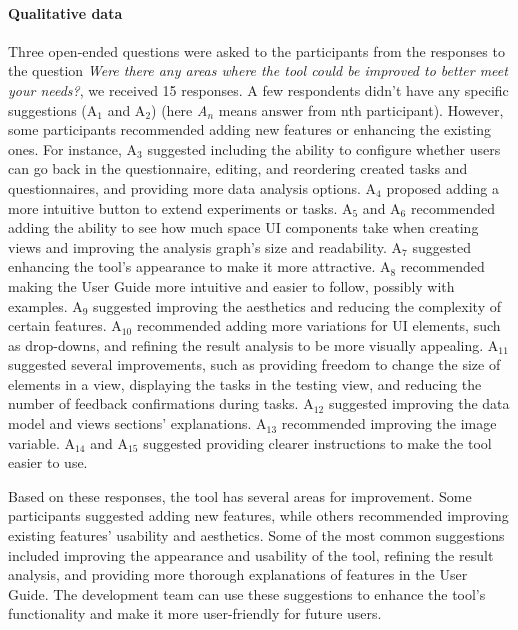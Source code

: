 \paragraph{Qualitative data}
Three open-ended questions were asked to the participants from the responses to the question \textit{Were there any areas where the tool could be improved to better meet your needs?}, we received 15 responses. 
A few respondents didn't have any specific suggestions (A$_1$ and A$_2$) (here \textit{A$_n$} means answer from nth participant). 
However, some participants recommended adding new features or enhancing the existing ones. 
For instance, A$_3$ suggested including the ability to configure whether users can go back in the questionnaire, editing, and reordering created tasks and questionnaires, and providing more data analysis options. 
A$_4$ proposed adding a more intuitive button to extend experiments or tasks. 
A$_5$ and A$_6$ recommended adding the ability to see how much space UI components take when creating views and improving the analysis graph's size and readability. 
A$_7$ suggested enhancing the tool's appearance to make it more attractive. 
A$_8$ recommended making the User Guide more intuitive and easier to follow, possibly with examples. 
A$_9$ suggested improving the aesthetics and reducing the complexity of certain features. 
A$_{10}$ recommended adding more variations for UI elements, such as drop-downs, and refining the result analysis to be more visually appealing. 
A$_{11}$ suggested several improvements, such as providing freedom to change the size of elements in a view, displaying the tasks in the testing view, and reducing the number of feedback confirmations during tasks.
A$_{12}$ suggested improving the data model and views sections' explanations.
A$_{13}$ recommended improving the image variable. 
A$_{14}$ and A$_{15}$ suggested providing clearer instructions to make the tool easier to use.

Based on these responses, the tool has several areas for improvement. 
Some participants suggested adding new features, while others recommended improving existing features' usability and aesthetics. 
Some of the most common suggestions included improving the appearance and usability of the tool, refining the result analysis, and providing more thorough explanations of features in the User Guide. 
The development team can use these suggestions to enhance the tool's functionality and make it more user-friendly for future users. 